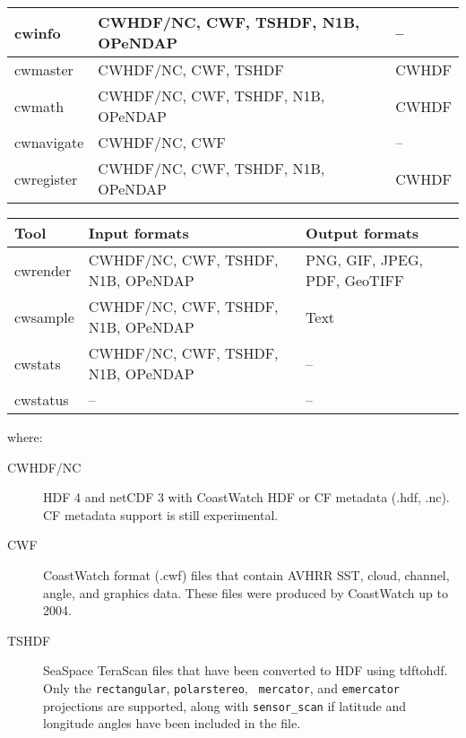 {\begin{tabular}{|l|p{5cm}|p{5cm}|}
  cwinfo & CWHDF/NC, CWF, TSHDF, N1B, OPeNDAP & -- \\ \hline

  cwmaster & CWHDF/NC, CWF, TSHDF & CWHDF \\ \hline

  cwmath & CWHDF/NC, CWF, TSHDF, N1B, OPeNDAP & CWHDF \\ \hline

  cwnavigate & CWHDF/NC, CWF & -- \\ \hline

  cwregister & CWHDF/NC, CWF, TSHDF, N1B, OPeNDAP & CWHDF \\ \hline

\end{tabular}

\begin{tabular}{|l|p{5cm}|p{5cm}|}
  \hline

  Tool & Input formats & Output formats \\ \hline 

  cwrender & CWHDF/NC, CWF, TSHDF, N1B, OPeNDAP & PNG, GIF, JPEG, PDF,
  GeoTIFF \\ \hline

  cwsample & CWHDF/NC, CWF, TSHDF, N1B, OPeNDAP & Text \\ \hline

  cwstats & CWHDF/NC, CWF, TSHDF, N1B, OPeNDAP & -- \\ \hline

  cwstatus & -- & -- \\ \hline

\end{tabular}

where:

\begin{description}

  \item[CWHDF/NC] HDF 4 and netCDF 3 with CoastWatch HDF or CF
  metadata (.hdf, .nc).  CF metadata support is still experimental.

  \item[CWF] CoastWatch format (.cwf) files that contain AVHRR SST, cloud,
  channel, angle, and graphics data.  These files were produced by
  CoastWatch up to 2004.

  \item[TSHDF] SeaSpace TeraScan files that have been converted to HDF
  using tdftohdf.  Only the {\tt rectangular}, {\tt polarstereo}, {\tt
  mercator}, and {\tt emercator} projections are supported, along with
  {\tt sensor\_scan} if latitude and longitude angles have been
  included in the file.


\end{description}}
